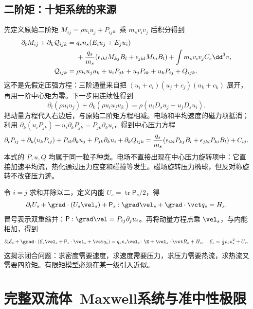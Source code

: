 \subsection{二阶矩：十矩系统的来源}
先定义原始二阶矩 $M_{ij}=\rho u_iu_j+P_{ij}$。乘 $m_sv_iv_j$ 后积分得到
\begin{align}
\partial_tM_{ij}+\partial_k\mathcal Q_{ijk}
={}&q_sn_s(E_iu_j+E_ju_i)\\
&+{q_s\over m_s}(\epsilon_{ikl}M_{kj}B_l+\epsilon_{jkl}M_{ki}B_l)
+\int m_sv_iv_j C_s\dd^3v,\nonumber\\
\mathcal Q_{ijk}={}&\rho u_iu_ju_k+u_iP_{jk}+u_jP_{ik}+u_kP_{ij}+Q_{ijk}.
\end{align}
这不是先假定压强方程：三阶通量来自把 $(u_i+c_i)(u_j+c_j)(u_k+c_k)$ 展开，再用一阶中心矩为零。下一步用连续性得到
\begin{equation}
\partial_t(\rho u_iu_j)+\partial_k(\rho u_iu_ju_k)
=\rho(u_iD_su_j+u_jD_su_i).
\end{equation}
把动量方程代入右边后，与原始二阶矩方程相减。电场和平均速度的磁力项抵消；利用
$\partial_k(u_iP_{jk})-u_i\partial_kP_{jk}=P_{jk}\partial_ku_i$，得到中心压力方程
\begin{align}
\partial_tP_{ij}+\partial_k(u_kP_{ij})+P_{ik}\partial_ku_j+P_{jk}\partial_ku_i+\partial_kQ_{ijk}
={q_s\over m_s}(\epsilon_{ikl}P_{kj}B_l+\epsilon_{jkl}P_{ki}B_l)+C_{ij}.\label{eq:pressure}
\end{align}
本式的 $P,u,Q$ 均属于同一粒子种类。电场不直接出现在中心压力旋转项中：它直接加速平均流，热化通过压力应变和碰撞等发生。磁场旋转压力椭球，但反对称旋转不改变压力迹。

令 $i=j$ 求和并除以二，定义内能 $U_s=\operatorname{tr}\mathsf P_s/2$，得
\begin{equation}\partial_tU_s+\grad\cdot(U_s\vel_s)+\mathsf P_s:\grad\vel_s+\grad\cdot\vct q_s=H_s.\label{eq:internal}\end{equation}
冒号表示双重缩并：$\mathsf P:\grad\vel=P_{ij}\partial_ju_i$。再将动量方程点乘 $\vel_s$，与内能相加，得到
\begin{equation}
\partial_t\mathcal E_s+\grad\cdot(\mathcal E_s\vel_s+\mathsf P_s\cdot\vel_s+\vct q_s)
=q_sn_s\vel_s\cdot\E+\vel_s\cdot\vct R_s+H_s,\quad
\mathcal E_s=\tfrac12\rho_su_s^2+U_s.\label{eq:energy}
\end{equation}
这揭示闭合问题：求密度需要速度，求速度需要压力，求压力需要热流，求热流又需要四阶矩。有限矩模型必须在某一级引入近似。

\section{完整双流体--Maxwell系统与准中性极限}
